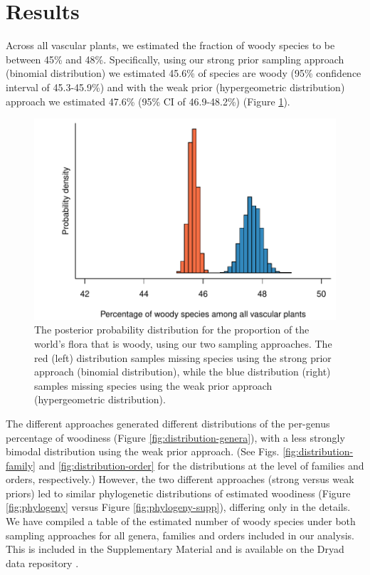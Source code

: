 \section{Results}

Across all vascular plants, we estimated the fraction of woody species
to be between 45\% and 48\%.
Specifically, using our strong prior sampling approach (binomial
distribution) we estimated 45.6\% of species are woody (95\%
confidence interval of 45.3-45.9\%) and with the weak prior
(hypergeometric distribution) approach we estimated 47.6\% (95\% CI of
46.9-48.2\%) (Figure \ref{fig:distribution-raw}).
%

\begin{figure}[p]
  \centering
  \includegraphics[width=\textwidth]{figs/distribution-raw}
  \caption[Estimates of woodiness proportion using alternative sampling
  approaches]{The posterior probability distribution for
    the proportion of the world's flora that is woody, using our two
    sampling approaches.  The red (left) distribution samples missing
    species using the strong prior approach (binomial distribution),
    while the blue distribution (right) samples missing species using
    the weak prior approach (hypergeometric distribution).}
  \label{fig:distribution-raw}
\end{figure}


The different approaches generated different distributions of the
per-genus percentage of woodiness (Figure
\ref{fig:distribution-genera}), with a less strongly bimodal
distribution using the weak prior approach. (See Figs.
\ref{fig:distribution-family} and \ref{fig:distribution-order} 
for the distributions at the level of families and orders, respectively.) 
However, the two different approaches (strong
versus weak priors) led to similar phylogenetic distributions of
estimated woodiness (Figure \ref{fig:phylogeny} versus Figure
\ref{fig:phylogeny-supp}), differing only in the details. We have compiled
a table of the estimated number of woody species under both sampling
approaches for all genera, families and orders included in our analysis.
This is included in the Supplementary Material and is available on the 
Dryad data repository \citep[doi:10.5061/dryad.v7m14]{FitzJohnDryad}.

